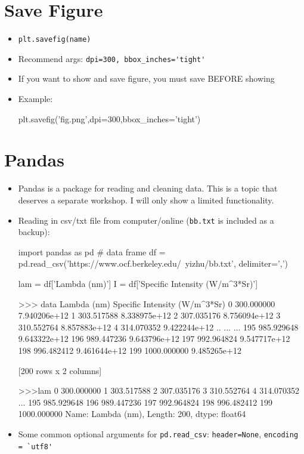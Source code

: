 \documentclass[12pt]{article}
\numberwithin{equation}{section}
\begin{document}
\section{Save Figure}
\begin{itemize}
    \item \verb|plt.savefig(name)|
    \item Recommend args: \verb|dpi=300, bbox_inches='tight'|
    \item If you want to show and save figure, you must save BEFORE showing
    \item Example:  
    \begin{python}
    plt.savefig('fig.png',dpi=300,bbox_inches='tight')
    \end{python}
\end{itemize}

\section{Pandas}
\begin{itemize}
    \item Pandas is a package for reading and cleaning data. This is a topic that deserves a separate workshop. I will only show a limited functionality.
    \item Reading in csv/txt file from computer/online (\verb|bb.txt| is included as a backup):
    \begin{python}
    import pandas as pd
    # data frame
    df = pd.read_csv('https://www.ocf.berkeley.edu/~yizhu/bb.txt',
                        delimiter=',')
    
    lam = df['Lambda (nm)']
    I = df['Specific Intensity (W/m^3*Sr)']

    >>> data
             Lambda (nm)  Specific Intensity (W/m^3*Sr)
    0     300.000000                   7.940206e+12
    1     303.517588                   8.338975e+12
    2     307.035176                   8.756094e+12
    3     310.552764                   8.857883e+12
    4     314.070352                   9.422244e+12
    ..           ...                            ...
    195   985.929648                   9.643322e+12
    196   989.447236                   9.643796e+12
    197   992.964824                   9.547717e+12
    198   996.482412                   9.461644e+12
    199  1000.000000                   9.485265e+12
    
    [200 rows x 2 columns]
    
    >>>lam
    0       300.000000
    1       303.517588
    2       307.035176
    3       310.552764
    4       314.070352
              ...     
    195     985.929648
    196     989.447236
    197     992.964824
    198     996.482412
    199    1000.000000
    Name: Lambda (nm), Length: 200, dtype: float64
    \end{python}
    \item Some common optional arguments for \verb|pd.read_csv|: \verb|header=None|, \verb|encoding = `utf8'|
\end{itemize}
\end{document}
